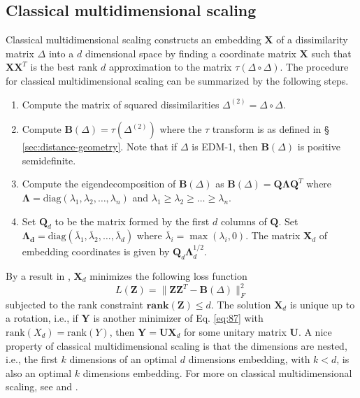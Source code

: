 \subsection{Classical multidimensional scaling}
\label{sec:classical-mds}
Classical multidimensional scaling \citep{torgesen52:_multid}
constructs an embedding $\mathbf{X}$ of a dissimilarity matrix
$\Delta$ into a $d$ dimensional space by finding a coordinate matrix
$\mathbf{X}$ such that $\mathbf{X}\mathbf{X}^{T}$ is the best rank $d$
approximation to the matrix $\tau(\Delta \circ \Delta)$. The
procedure for classical multidimensional scaling can be summarized by
the following steps.
\begin{enumerate}
\item Compute the matrix of squared dissimilarities $\Delta^{(2)} =
  \Delta \circ \Delta$.
\item Compute $\mathbf{B}(\Delta) = \tau(\Delta^{(2)})$ where the
  $\tau$ transform is as defined in \S
  \ref{sec:distance-geometry}. Note that if $\Delta$ is EDM-1, then
  $\mathbf{B}(\Delta)$ is positive semidefinite. 
\item Compute the eigendecomposition of $\mathbf{B}(\Delta)$ as
  $\mathbf{B}(\Delta) = \mathbf{Q} \bm{\Lambda} \mathbf{Q}^{T}$ where
  $\bm{\Lambda} = \mathrm{diag}(\lambda_1, \lambda_2, \dots,
  \lambda_n)$ and $\lambda_1 \geq \lambda_2 \geq \dots \geq
  \lambda_n$.  
\item Set $\mathbf{Q}_d$ to be the matrix formed by the first $d$
  columns of $\mathbf{Q}$. Set $\bm{\Lambda_{d}} =
  \mathrm{diag}(\bar{\lambda}_1,\bar{\lambda}_2, \dots,
  \bar{\lambda}_d)$ where $\bar{\lambda}_i = \max(\lambda_i, 0)$. The
  matrix $\mathbf{X}_d$ of embedding coordinates is given by
  $\mathbf{Q}_d \mathbf{\Lambda}_{d}^{1/2}$.
\end{enumerate}
 By a result in \citet{eckart36:_approx}, $\mathbf{X}_d$ minimizes the
following loss function
\begin{equation}
  \label{eq:87}
 L(\mathbf{Z}) = \| \mathbf{Z} \mathbf{Z}^{T} - \mathbf{B}(\Delta)
 \|_F^{2} 
\end{equation}
subjected to the rank constraint $\mathbf{rank}(\mathbf{Z}) \leq
d$. The solution $\mathbf{X}_d$ is unique up to a rotation, i.e., if
$\mathbf{Y}$ is another minimizer of Eq. \eqref{eq:87} with
$\mathrm{rank}(X_d) = \mathrm{rank}(Y)$, then $\mathbf{Y} =
\mathbf{U}\mathbf{X}_d$ for some unitary matrix $\mathbf{U}$. A nice
property of classical multidimensional scaling is that the dimensions
are nested, i.e., the first $k$ dimensions of an optimal $d$
dimensions embedding, with $k < d$, is also an optimal $k$ dimensions
embedding. For more on classical multidimensional scaling, see
\citet{borg05:_moder} and \citet{gower66:_some}.
%
%


